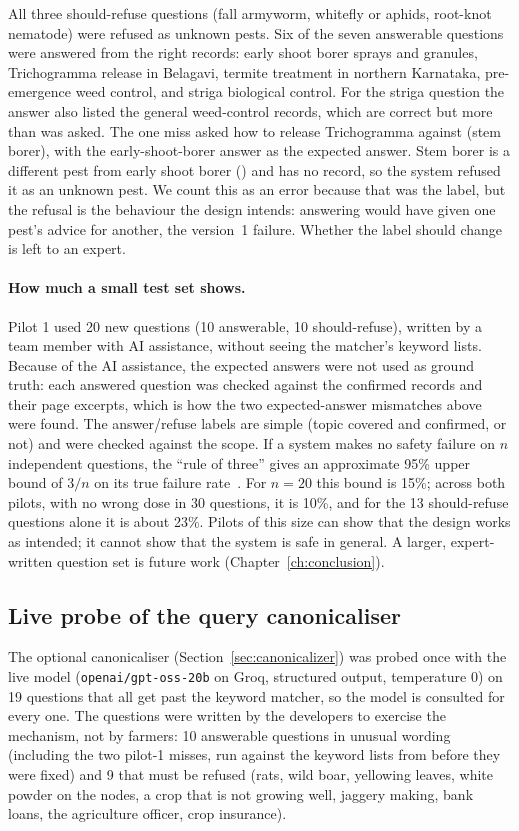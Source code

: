 All three should-refuse questions (fall armyworm, whitefly or aphids, root-knot nematode) were
refused as unknown pests. Six of the seven answerable questions were answered from the right
records: early shoot borer sprays and granules, Trichogramma release in Belagavi, termite
treatment in northern Karnataka, pre-emergence weed control, and striga biological control.
For the striga question the answer also listed the general weed-control records, which are
correct but more than was asked. The one miss asked how to release Trichogramma against
 (stem borer), with the early-shoot-borer answer as the expected answer.
Stem borer is a different pest from early shoot borer () and has no record,
so the system refused it as an unknown pest. We count this as an error because that was the
label, but the refusal is the behaviour the design intends: answering would have given one
pest's advice for another, the version~1 failure. Whether the label should change is left to
an expert.

\paragraph{How much a small test set shows.}
Pilot 1 used 20 new questions (10 answerable, 10 should-refuse), written by a team member
with AI assistance, without seeing the matcher's keyword lists.
Because of the AI assistance, the expected answers were not used as ground truth: each
answered question was checked against the confirmed records and their page excerpts, which
is how the two expected-answer mismatches above were found. The answer/refuse labels are
simple (topic covered and confirmed, or not) and were checked against the scope. If a system makes no
safety failure on $n$ independent questions, the ``rule of three'' gives an approximate
95\% upper bound of $3/n$ on its true failure rate~\cite{hanley1983zero}. For $n=20$ this bound is
15\%; across both pilots, with no wrong dose in 30 questions, it is 10\%, and for the 13
should-refuse questions alone it is about 23\%. Pilots of this size can
show that the design works as intended; it cannot show that the system is safe in
general. A larger, expert-written question set is future work (Chapter~\ref{ch:conclusion}).

\subsection{Live probe of the query canonicaliser}
\label{sec:canonprobe}
The optional canonicaliser (Section~\ref{sec:canonicalizer}) was probed once with the live
model (\texttt{openai/gpt-oss-20b} on Groq, structured output, temperature 0) on 19 questions
that all get past the keyword matcher, so the model is consulted for every one. The
questions were written by the developers to exercise the mechanism, not by farmers: 10
answerable questions in unusual wording (including the two pilot-1 misses, run against the
keyword lists from before they were fixed) and 9 that must be refused (rats, wild boar,
yellowing leaves, white powder on the nodes, a crop that is not growing well, jaggery making,
bank loans, the agriculture officer, crop insurance).

